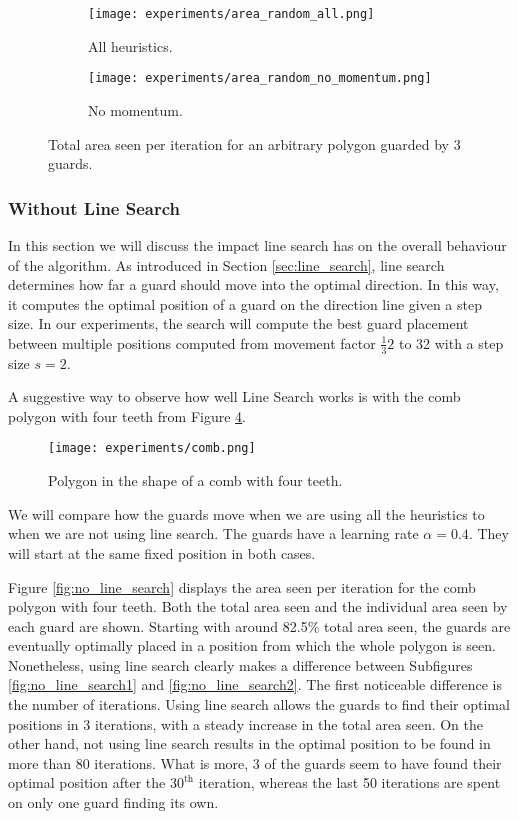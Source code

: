 \begin{figure}[h!]
    \centering
    \begin{subfigure}{0.45\textwidth}
        \texttt{[image: experiments/area\_random\_all.png]}
        \caption{All heuristics.}
        \label{fig:no_momentum1}
    \end{subfigure}
    \begin{subfigure}{0.45\textwidth}
        \texttt{[image: experiments/area\_random\_no\_momentum.png]}
        \caption{No momentum.}
        \label{fig:no_momentum2}
    \end{subfigure}
    \caption{Total area seen per iteration for an arbitrary polygon guarded by 3 guards.}
    \label{fig:no_momentum}
\end{figure}

\subsubsection{Without Line Search}
In this section we will discuss the impact line search has on the overall behaviour of the algorithm. As introduced in Section \ref{sec:line_search}, line search determines how far a guard should move into the optimal direction. In this way, it computes the optimal position of a guard on the direction line given a step size.
In our experiments, the search will compute the best guard placement between multiple positions computed from movement factor $\frac 1 32$ to 32 with a step size $s = 2$.

A suggestive way to observe how well Line Search works is with the comb polygon with four teeth from Figure \ref{fig:comb}.

\begin{figure}[h!]
    \centering
    \texttt{[image: experiments/comb.png]}
    \caption{Polygon in the shape of a comb with four teeth.}
    \label{fig:comb}
\end{figure}

We will compare how the guards move when we are using all the heuristics to when we are not using line search. The guards have a learning rate $\alpha = 0.4$. They will start at the same fixed position in both cases.

Figure \ref{fig:no_line_search} displays the area seen per iteration for the comb polygon with four teeth. Both the total area seen and the individual area seen by each guard are shown. Starting with around 82.5\% total area seen, the guards are eventually optimally placed in a position from which the whole polygon is seen. Nonetheless, using line search clearly makes a difference between Subfigures \ref{fig:no_line_search1} and \ref{fig:no_line_search2}. The first noticeable difference is the number of iterations. Using line search allows the guards to find their optimal positions in 3 iterations, with a steady increase in the total area seen. On the other hand, not using line search results in the optimal position to be found in more than 80 iterations. What is more, 3 of the guards seem to have found their optimal position after the $30^{\text{th}}$ iteration, whereas the last 50 iterations are spent on only one guard finding its own.


